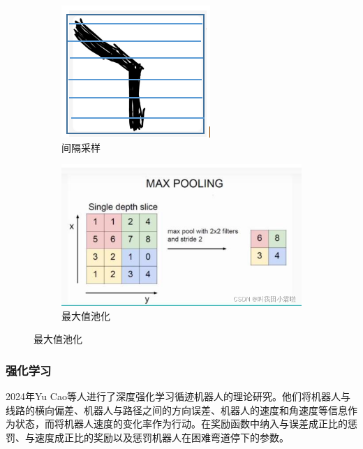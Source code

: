 \documentclass{report}
\begin{document}
\begin{figure}[ht]
  \centering
 \begin{subfigure}[b]{0.4\textwidth}
   \centering
   \includegraphics[width=\textwidth]{figures/jumpscan.png}
   \caption{间隔采样}
   \label{fig:label}
 \end{subfigure}
 \hfill
 \begin{subfigure}[b]{0.4\textwidth}
   \centering
   \includegraphics[width=\textwidth]{figures/pooling.png}
   \caption{最大值池化}
   \label{fig:label}
 \end{subfigure}
 \hfill

\end{figure}
\newpage
\subsubsection{强化学习}
\label{subsec:label}
2024年Yu Cao等人进行了深度强化学习循迹机器人的理论研究\cite{cao2024path}。他们将机器人与线路的横向偏差、机器人与路径之间的方向误差、机器人的速度和角速度等信息作为状态，而将机器人速度的变化率作为行动。在奖励函数中纳入与误差成正比的惩罚、与速度成正比的奖励以及惩罚机器人在困难弯道停下的参数。
\end{document}
